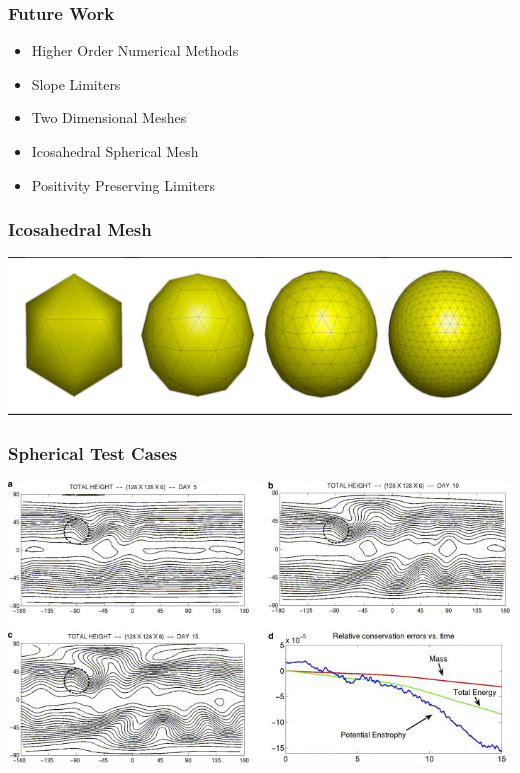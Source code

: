 \documentclass[10pt]{beamer}
\begin{document}
      \begin{frame}
        \frametitle{Future Work}
        \begin{itemize}
          \item Higher Order Numerical Methods
          \item Slope Limiters
          \item Two Dimensional Meshes
          \item Icosahedral Spherical Mesh
          \item Positivity Preserving Limiters
        \end{itemize}
      \end{frame}

      \begin{frame}
        \frametitle{Icosahedral Mesh}
        \includegraphics[scale=0.3]{Figures/icosahedral_mesh.pdf}
      \end{frame}

      \begin{frame}
        \frametitle{Spherical Test Cases}
        \centering
        \includegraphics[scale=2.6]{Figures/mountain_test_problem.jpg}
      \end{frame}
\end{document}
